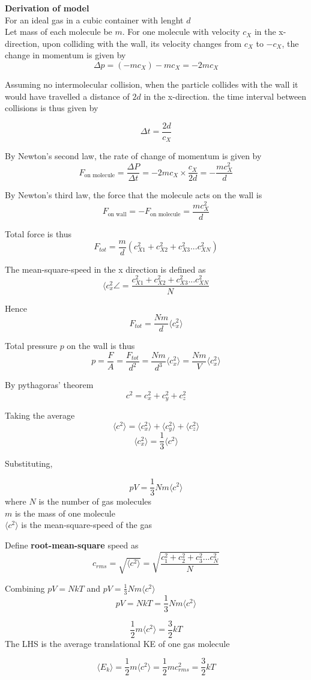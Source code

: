 \documentclass[a4paper, 10pt]{article}
\begin{document}
\textbf{Derivation of model} \\

For an ideal gas in a cubic container with lenght $d$  \\
Let mass of each molecule be $m$. For one molecule with velocity $c_X$ in the x-direction, upon colliding with the wall, its velocity changes from $c_X$ to $-c_X$, the change in momentum is given by
\[
   \Delta p = (-mc_X) - mc_X = -2 mc_X
\]

Assuming no intermolecular collision, when the particle collides with the wall it would have travelled a distance of $2d$ in the x-direction. the time interval between collisions is thus given by

\[
\Delta t = \frac{2d}{c_X}
\]

By Newton's second law, the rate of change of momentum is given by
\[
   F_{\text{on molecule}} = \frac{\Delta P}{\Delta t} = -2mc_X \times \frac{c_X}{2d} = -\frac{mc_X^2}{d}
\]

By Newton's third law, the force that the molecule acts on the wall is 
\[
   F_{\text{on wall}} = - F_{\text{on molecule}} = \frac{mc_X^2}{d}
\]

Total force is thus
\[
   F_{tot} = \frac{m}{d}(c_{X1}^2 + c_{X2}^2 + c_{X3}^2 ... c_{XN}^2)
\]

The mean-square-speed in the x direction is defined as 
\[
\langle c_x^2 \angle = \frac{c_{X1}^2 + c_{X2}^2 + c_{X3}^2 ... c_{XN}^2}{N}
\]

Hence 
\[
   F_{tot} = \frac{Nm}{d} \langle c_x^2 \rangle
\]

Total pressure $p$ on the wall is thus
\[
   p = \frac{F}{A} = \frac{F_{tot}}{d^2} = \frac{Nm}{d^3} \langle c_x^2 \rangle = \frac{Nm}{V}\langle c_x^2 \rangle 
\]

By pythagoras' theorem
\[
c^2 = c_x^2 + c_y^2 + c_z^2
\]

Taking the average
\[
\langle c^2 \rangle = \langle c_x^2 \rangle + \langle c_y^2 \rangle + \langle c_z^2 \rangle
\]
\[
\langle c_x^2 \rangle = \frac{1}{3} \langle c^2 \rangle
\]

Substituting, 
\begin{framed}
\[
pV = \frac{1}{3} Nm \langle c^2 \rangle
\]
where $N$ is the number of gas molecules \\
$m$ is the mass of one molecule \\
$\langle c^2 \rangle$ is the mean-square-speed of the gas
\end{framed}	

Define \textbf{root-mean-square} speed as 
\[
   c_{rms} = \sqrt{\langle c^2 \rangle} = \sqrt{\frac{c_1^2 + c_2^2 + c_3^2 ... c_N^2}{N}}
\]


Combining $pV = NkT$  and $pV = \frac{1}{3}Nm\langle c^2 \rangle$ 
\[
pV = NkT = \frac{1}{3}Nm \langle c^2 \rangle
\]

\[
\frac{1}{2}m \langle c^2 \rangle = \frac{3}{2} kT
\]
The LHS is the average translational KE of one gas molecule 
\begin{framed}
   \[
      \langle E_k \rangle = \frac{1}{2}m \langle c^2 \rangle = \frac{1}{2}mc_{rms}^2 = \frac{3}{2}kT
   \]
   
\end{framed}	
\end{document}
